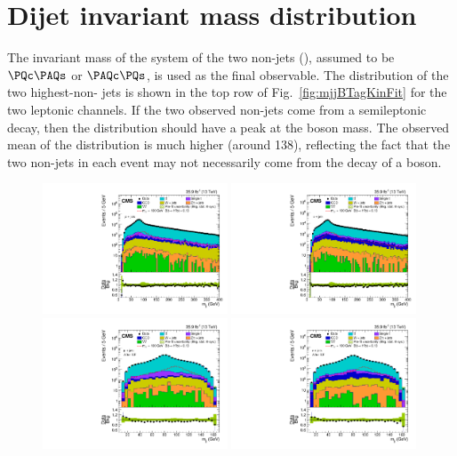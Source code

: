 \section{Dijet invariant mass distribution}
\label{s:secKF}
The invariant mass of the system of the two non-\PQb jets (\mjj),
assumed to be $\PQc\PAQs$ or $\PAQc\PQs$, is used as the final
observable. The \mjj distribution of the two highest-\pt non-\PQb
jets is shown in the top row of Fig.~\ref{fig:mjjBTagKinFit} for the
two leptonic channels. If the two observed non-\PQb jets come from
a semileptonic \ttbar decay, then the \mjj distribution should have a
peak at the \PW boson mass. The observed mean of the \mjj distribution
is much higher (around 138\GeV), reflecting the fact that the two
non-\PQb jets in each event may not necessarily come from the decay of a
\PW boson.
\begin{figure}
    \centering
    \includegraphics[width=0.49\textwidth]{Figure_002-a.pdf}
    \includegraphics[width=0.49\textwidth]{Figure_002-b.pdf}
    \includegraphics[width=0.49\textwidth]{Figure_002-c.pdf}
    \includegraphics[width=0.49\textwidth]{Figure_002-d.pdf}

\end{figure}
